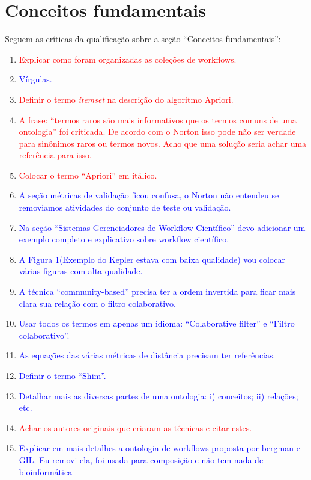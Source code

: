 \chapter{Conceitos fundamentais}\label{CAP_CONCEITOS_FUNDAMENTAIS}

Seguem as críticas da qualificação sobre a seção ``Conceitos fundamentais'':
\begin{enumerate}
\item \textcolor{red}{Explicar como foram organizadas as coleções de workflows.}
\item \textcolor{blue}{Vírgulas.}
\item \textcolor{red}{Definir o termo \emph{itemset} na descrição do algoritmo Apriori.}
\item \textcolor{red}{A frase: ``termos raros são mais informativos que os termos comuns de uma ontologia'' foi criticada. De acordo com o Norton isso pode não ser verdade para sinônimos raros ou termos novos. Acho que uma solução seria achar uma referência para isso.}
\item \textcolor{red}{Colocar o termo ``Apriori'' em itálico.}
\item \textcolor{blue}{A seção métricas de validação ficou confusa, o Norton não entendeu se removiamos atividades do conjunto de teste ou validação.}
\item \textcolor{blue}{Na seção ``Sistemas Gerenciadores de Workflow Científico'' devo adicionar um exemplo completo e explicativo sobre workflow científico.}
\item \textcolor{blue}{A Figura 1(Exemplo do Kepler estava com baixa qualidade) vou colocar várias figuras com alta qualidade.}
\item \textcolor{blue}{A técnica ``community-based'' precisa ter a ordem invertida para ficar mais clara sua relação com o filtro colaborativo.}
\item \textcolor{blue}{Usar todos os termos em apenas um idioma: ``Colaborative filter'' e ``Filtro colaborativo''.}
\item \textcolor{blue}{As equações das várias métricas de distância precisam ter referências.}
\item \textcolor{blue}{Definir o termo ``Shim''.}
\item \textcolor{blue}{Detalhar mais as diversas partes de uma ontologia: i) conceitos; ii) relações; etc.}
\item \textcolor{red}{Achar os autores originais que criaram as técnicas e citar estes.}
\item \textcolor{blue}{Explicar em mais detalhes a ontologia de workflows proposta por bergman e GIL. Eu removi ela, foi usada para composição e não tem nada de bioinformática}

\end{enumerate}
